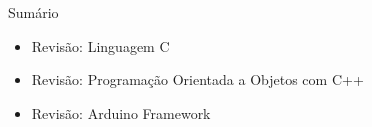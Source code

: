 
\begin{frame}{Sumário}
    \begin{itemize}
        \item Revisão: Linguagem C
        \item Revisão: Programação Orientada a Objetos com C++
        \item Revisão: Arduino Framework
    \end{itemize}
\end{frame}